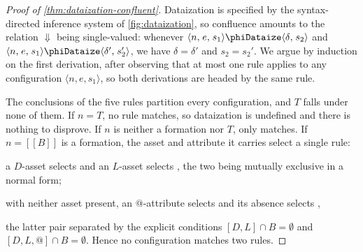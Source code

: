 
\begin{proof}[Proof of \cref{thm:dataization-confluent}]
Dataization is specified by the syntax-directed inference system of
  \cref{fig:dataization}, so confluence amounts to the relation $\Downarrow$
  being single-valued: whenever \(\phinoDataize{n}{e}{s_1}{\delta}{s_2}\)
  and \(\phinoDataize{n}{e}{s_1}{\delta'}{s_2'}\), we have \(\delta = \delta'\)
  and \(s_2 = s_2'\).
We argue by induction on the first derivation, after observing that at most
  one rule applies to any configuration \(\langle n, e, s_1 \rangle\),
  so both derivations are headed by the same rule.

The conclusions of the five rules partition every configuration, and $T$ falls
  under none of them.
If $n = T$, no rule matches, so dataization is undefined and there is nothing
  to disprove.
If \(n\) is neither a formation nor $T$, only  matches.
If $n = [[ B ]]$ is a formation, the asset and attribute it carries select
  a single rule:
  \begin{inparaenum}[a)]
  \item a $D$-asset selects  and an $L$-asset selects
    , the two being mutually exclusive in a normal form;
  \item with neither asset present, an $@$-attribute selects 
    and its absence selects ,
  \end{inparaenum}
  the latter pair separated by the explicit conditions
  $[D, L] \cap B = \emptyset$ and $[ D, L, @ ] \cap B = \emptyset$.
Hence no configuration matches two rules.


\end{proof}
